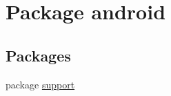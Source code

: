 \hypertarget{namespaceandroid}{
\section{Package android}
\label{namespaceandroid}
}
\subsection*{Packages}
\begin{CompactItemize}
\item 
package \hyperlink{namespaceandroid_1_1support}{support}
\end{CompactItemize}
